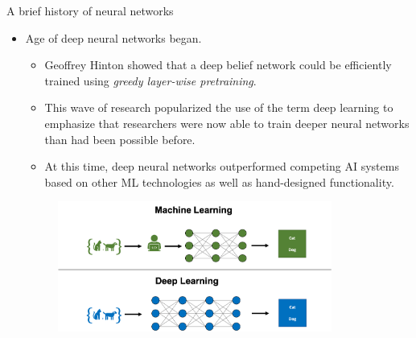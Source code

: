 \begin{vbframe}{A brief history of neural networks}
\begin{itemize}
\item {} Age of deep neural networks began.

\begin{itemize}
\footnotesize\item Geoffrey Hinton showed that a deep belief network could be efficiently trained using \textit{greedy layer-wise pretraining}.
\footnotesize\item This wave of research popularized the use of the term deep learning to emphasize that researchers were now able to train deeper neural networks than had been possible before.
\footnotesize\item At this time, deep neural networks outperformed competing AI systems based on other ML technologies as well as hand-designed functionality.
\end{itemize}
\begin{figure}
\includegraphics[width=9cm]{figure/dl_feature2.png}

\end{figure}
\end{itemize}
\framebreak



\end{vbframe}
